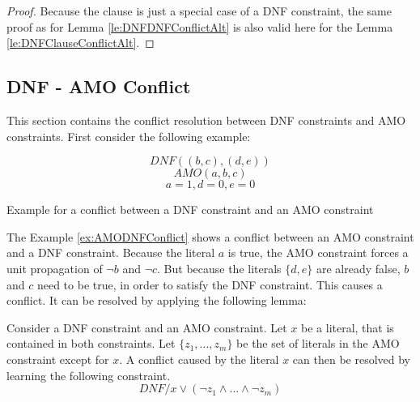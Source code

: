 \begin{proof}
Because the clause is just a special case of a DNF constraint, the same proof as for Lemma \ref{le:DNFDNFConflictAlt} is also valid here for the Lemma \ref{le:DNFClauseConflictAlt}.
\end{proof}



\subsection{DNF - AMO Conflict}

This section contains the conflict resolution between DNF constraints and AMO constraints. First consider the following example:

\begin{example}
\begin{leftbar}
\begin{displaymath}
DNF((b,c),(d,e))
\end{displaymath}
\begin{displaymath}
AMO(a,b,c)
\end{displaymath}
\begin{displaymath}
a = 1, d = 0, e = 0
\end{displaymath}
\end{leftbar}
\caption{Example for a conflict between a DNF constraint and an AMO constraint}
\label{ex:AMODNFConflict}
\end{example}


The Example \ref{ex:AMODNFConflict} shows a conflict between an AMO constraint and a DNF constraint. Because the literal $a$ is true, the AMO constraint forces a unit propagation of $\neg b$ and $\neg c$. But because the literals $\{d,e\}$ are already false, $b$ and $c$ need to be true, in order to satisfy the DNF constraint. This causes a conflict. It can be resolved by applying the following lemma:


\begin{lemma}
\begin{leftbar}
Consider a DNF constraint and an AMO constraint. Let $x$ be a literal, that is contained in both constraints. Let $\{z_1,...,z_m\}$ be the set of literals in the AMO constraint except for $x$. A conflict caused by the literal $x$ can then be resolved by learning the following constraint.
\begin{displaymath}
DNF / x \vee (\neg z_1 \wedge ... \wedge \neg z_m)
\end{displaymath}
\end{leftbar}
\label{le:AMODNFConflict}
\end{lemma}

